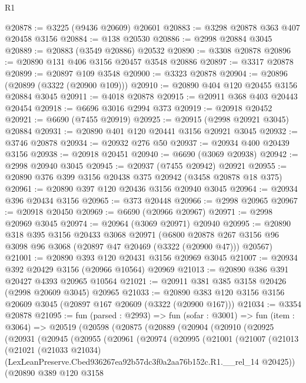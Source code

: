 \begin{lexlean}{R1}
\begin{coremodule}
@20878 := @3225 (@9436 @20609) @20601
@20883 := @3298 @20878 @363 @407 @20458 @3156
@20884 := @138 @20530
@20886 := @2998 @20884 @3045
@20889 := @20883 (@3549 @20886) @20532
@20890 := @3308 @20878
@20896 := @20890 @131 @406 @3156 @20457 @3548 @20886
@20897 := @3317 @20878
@20899 := @20897 @109 @3548
@20900 := @3323 @20878
@20904 := @20896 (@20899 (@3322 (@20900 @109)))
@20910 := @20890 @404 @120 @20455 @3156 @20884 @3045
@20911 := @4018 @20878
@20915 := @20911 @368 @403 @20443 @20454
@20918 := @6696 @3016 @2994 @373
@20919 := @20918 @20452
@20921 := @6690 (@7455 @20919)
@20925 := @20915 (@2998 @20921 @3045) @20884
@20931 := @20890 @401 @120 @20441 @3156 @20921 @3045
@20932 := @3746 @20878
@20934 := @20932 @276 @50
@20937 := @20934 @400 @20439 @3156
@20938 := @20918 @20451
@20940 := @6690 (@3069 @20938)
@20942 := @2998 @20940 @3045
@20945 := @20937 (@7455 @20942) @20921
@20955 := @20890 @376 @399 @3156 @20438 @375 @20942 (@3458 @20878 @18 @375)
@20961 := @20890 @397 @120 @20436 @3156 @20940 @3045
@20964 := @20934 @396 @20434 @3156
@20965 := @373 @20448
@20966 := @2998 @20965
@20967 := @20918 @20450
@20969 := @6690 (@20966 @20967)
@20971 := @2998 @20969 @3045
@20974 := @20964 (@3069 @20971) @20940
@20995 := @20890
    @318
    @395
    @3156
    @20433
    @3068
    @20971
    (@6800 @20878 @267 @3156 @96 @3098 @96 @3068 (@20897 @47 @20469 (@3322 (@20900 @47))) @20567)
@21001 := @20890 @393 @120 @20431 @3156 @20969 @3045
@21007 := @20934 @392 @20429 @3156 (@20966 @10564) @20969
@21013 := @20890 @386 @391 @20427 @4393 @20965 @10564
@21021 := @20911 @381 @385 @3158 @20426 (@2998 @20609 @3045) @20965
@21033 := @20890 @383 @120 @3156 @3156 @20609 @3045 (@20897 @167 @20609 (@3322 (@20900 @167)))
@21034 := @3354 @20878
@21095 := fun (parsed : @2993) =>
  fun (sofar : @3001) =>
  fun (item : @3064) =>
  @20519
    (@20598
      (@20875
        (@20889
          (@20904
            (@20910
              (@20925
                (@20931
                  (@20945
                    (@20955
                      (@20961
                        (@20974
                          (@20995
                            (@21001
                              (@21007
                                (@21013
                                  (@21021
                                    (@21033 @21034)
                                    (LexLeanPreserve.Cbed936267ea92b57dc3f0a2aa76b152c.R1.__rel_14
                                      @20425))
                                  (@20890
                                    @389
                                    @120
                                    @3158

\end{coremodule}
\end{lexlean}
